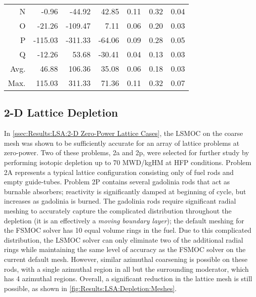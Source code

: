 {{{\begin{table}[h]
\begin{tabular}{rrrr@{\hskip 1cm}rrr}
                          N &     -0.96 &    -44.92 &     42.85 &      0.11 &      0.32 &      0.04\\
                          O &    -21.26 &   -109.47 &      7.11 &      0.06 &      0.20 &      0.03\\
                          P &   -115.03 &   -311.33 &    -64.06 &      0.09 &      0.28 &      0.05\\
                          Q &    -12.26 &     53.68 &    -30.41 &      0.04 &      0.13 &      0.03\\\midrule
                        Avg. &     46.88 &    106.36 &     35.08 &      0.06 &      0.18 &      0.03\\
                        Max. &    115.03 &    311.33 &     71.36 &      0.11 &      0.32 &      0.07\\\bottomrule
                \end{tabular}
            \end{table}
        }
        \subsection{2-D Lattice Depletion}{\label{ssec:Results:LSA:2-D Lattice Depletion}
            In \cref{ssec:Results:LSA:2-D Zero-Power Lattice Cases}, the \ac{LSMOC} on the coarse mesh was shown to be sufficiently accurate for an array of lattice problems at zero-power.
            Two of these problems, 2a and 2p, were selected for further study by performing isotopic depletion up to 70 MWD/kgHM at HFP conditions.
            Problem 2A represents a typical lattice configuration consisting only of fuel rods and empty guide-tubes.
            Problem 2P contains several gadolinia rods that act as burnable absorbers; reactivity is significantly damped at beginning of cycle, but increases as gadolinia is burned.
            The gadolinia rods require significant radial meshing to accurately capture the complicated distribution throughout the depletion (it is an effectively a \emph{moving boundary layer}); the default meshing for the \ac{FSMOC} solver has 10 equal volume rings in the fuel.
            Due to this complicated distribution, the \ac{LSMOC} solver can only eliminate two of the additional radial rings while maintaining the same level of accuracy as the \ac{FSMOC} solver on the current default mesh.
            However, similar azimuthal coarsening is possible on these rods, with a single azimuthal region in all but the surrounding moderator, which has 4 azimuthal regions.
            Overall, a significant reduction in the lattice mesh is still possible, as shown in \cref{fig:Results:LSA:Depletion:Meshes}.

}}}
